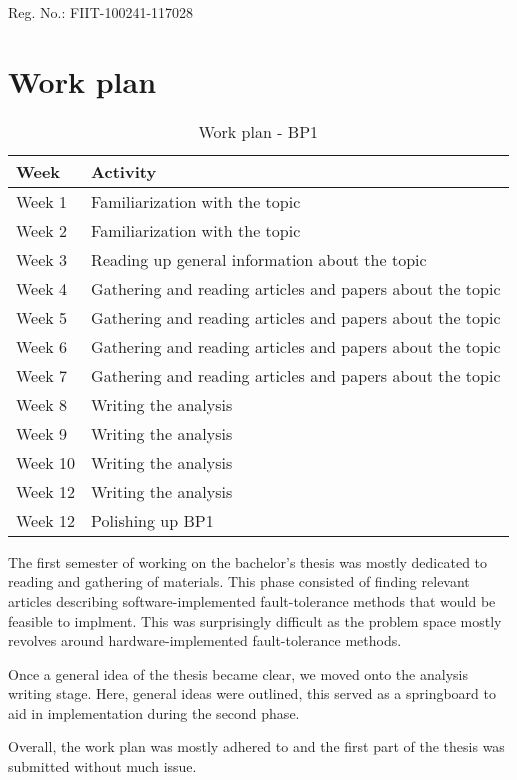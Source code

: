 \documentclass[12pt, letterpaper, slovak]{article}
\begin{document}
\begin{appendices}

Reg. No.: FIIT-100241-117028

\section{Work plan}

\begin{table}[!h]
\centering
\begin{tabular}{|l|l|}
\hline
\textbf{Week} & \textbf{Activity} \\
\hline
Week 1 & Familiarization with the topic \\
Week 2 & Familiarization with the topic \\
Week 3 & Reading up general information about the topic \\
Week 4 & Gathering and reading articles and papers about the topic \\
Week 5 & Gathering and reading articles and papers about the topic \\
Week 6 & Gathering and reading articles and papers about the topic \\
Week 7 & Gathering and reading articles and papers about the topic \\
Week 8 & Writing the analysis \\
Week 9 & Writing the analysis \\
Week 10 & Writing the analysis \\
Week 12 & Writing the analysis \\
Week 12 & Polishing up BP1 \\
\hline
\end{tabular}
\caption{Work plan - BP1}
\label{tab:work_plan_bp1}
\end{table}

The first semester of working on the bachelor's thesis was mostly dedicated to reading and gathering of materials. This phase consisted of finding relevant articles describing software-implemented fault-tolerance methods that would be feasible to implment. This was surprisingly difficult as the problem space mostly revolves around hardware-implemented fault-tolerance methods.

Once a general idea of the thesis became clear, we moved onto the analysis writing stage. Here, general ideas were outlined, this served as a springboard to aid in implementation during the second phase.

Overall, the work plan was mostly adhered to and the first part of the thesis was submitted without much issue.


\end{appendices}
\end{document}
